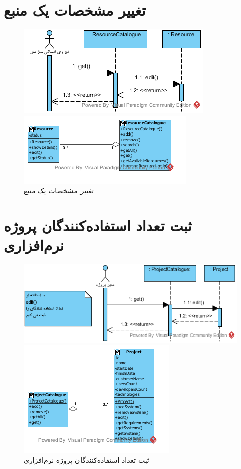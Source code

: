 \section{تغییر مشخصات یک منبع}
\begin{figure}[H]
	\centering
	\includegraphics[scale=1]{img/sequence-analysis/EditResourceAttributes}
	
	
	\includegraphics[scale=1]{img/sequence-analysis/EditResourceAttributesC}
	\caption{تغییر مشخصات یک منبع}
\end{figure}

\section{ثبت تعداد استفاده‌کنندگان پروژه نرم‌افزاری}
\begin{figure}[H]
	\centering
	\includegraphics[scale=1]{img/sequence-analysis/AddUsersCount}
	
	
	\includegraphics[scale=1]{img/sequence-analysis/AddUsersCountC}
	\caption{ثبت تعداد استفاده‌کنندگان پروژه نرم‌افزاری}
\end{figure}


